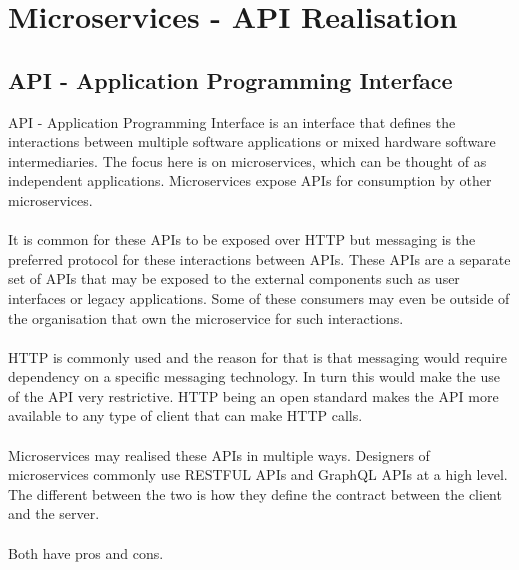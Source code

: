 
\section{Microservices - API Realisation}

\subsection{API - Application Programming Interface}
API - Application Programming Interface is an interface that defines the interactions between multiple software applications or mixed hardware software intermediaries.
The focus here is on microservices, which can be thought of as independent applications.
Microservices expose APIs for consumption by other microservices.

\paragraph{}
It is common for these APIs to be exposed over HTTP but messaging is the preferred protocol for these interactions between APIs.
These APIs are a separate set of APIs that may be exposed to the external components such as user interfaces or legacy applications.
Some of these consumers may even be outside of the organisation that own the microservice for such interactions.

\paragraph{}
HTTP is commonly used and the reason for that is that messaging would require dependency on a specific messaging technology.
In turn this would make the use of the API very restrictive.
HTTP being an open standard makes the API more available to any type of client that can make HTTP calls.

\paragraph{}
Microservices may realised these APIs in multiple ways.
Designers of microservices commonly use RESTFUL APIs and GraphQL APIs at a high level.
The different between the two is how they define the contract between the client and the server.

\paragraph{}
Both have pros and cons.



